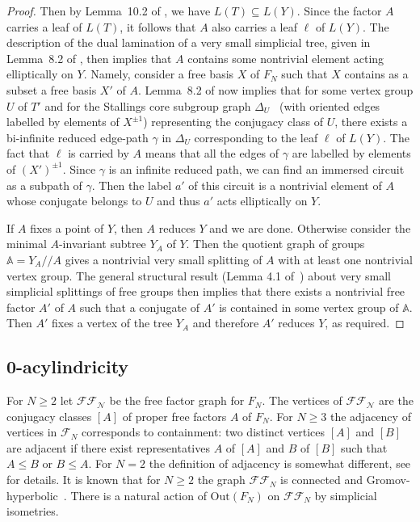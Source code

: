 \documentclass[10pt]{amsart}
\newcommand\<{\langle}
\renewcommand\>{\rangle}
\newcommand{\Out}{\mbox{Out}}
\theoremstyle{definition}
\begin{document}
\begin{proof}
Then by Lemma~10.2 of \cite{KL3}, we have $L(T)\subseteq
L(Y)$.  Since the factor $A$ carries a leaf of $L(T)$, it follows
that $A$ also carries a leaf $\ell$ of $L(Y)$. The  description of the dual lamination of a very small simplicial tree,
given in Lemma~8.2 of \cite{KL3}, then implies that $A$
contains some nontrivial element acting elliptically on $Y$. Namely, consider a free basis $X$ of $F_N$ such that $X$ contains as a subset a free basis $X'$ of $A$.  Lemma~8.2 of \cite{KL3} now implies that for some vertex group $U$ of $T'$ and for the Stallings core subgroup graph $\Delta_U$~\cite{KM} (with oriented edges labelled by elements of $X^{\pm 1}$) representing the conjugacy class of $U$, there exists a bi-infinite reduced edge-path $\gamma$ in $\Delta_U$ corresponding to the leaf $\ell$ of $L(Y)$. The fact that $\ell$ is carried by $A$ means that all the edges of $\gamma$ are labelled by elements of $(X')^{\pm 1}$. Since $\gamma$ is an infinite reduced path, we can find an immersed circuit as a subpath of $\gamma$. Then the label $a'$ of this circuit is a nontrivial element of $A$ whose conjugate belongs to $U$ and thus $a'$ acts elliptically on $Y$.

If $A$ fixes a point of $Y$, then $A$ reduces $Y$ and we are
done. Otherwise consider the minimal $A$-invariant subtree $Y_A$ of
$Y$. Then the quotient graph of groups $\mathbb A=Y_A//A$ gives a
nontrivial very small splitting of $A$ with at least one nontrivial
vertex group. The general structural result (Lemma 4.1 of~\cite{BF93}) about very small
simplicial splittings of free groups then implies that there exists a nontrivial free factor $A'$ of $A$ such that
a conjugate of $A'$ is contained in some vertex group of $\mathbb
A$. Then $A'$ fixes a vertex of the tree $Y_A$ and therefore $A'$
reduces $Y$, as required.

\end{proof}

\subsection{0-acylindricity}

For $N\ge 2$ let $\mathcal{FF_N}$ be the free factor graph for
$F_N$. The vertices of $\mathcal{FF_N}$ are the conjugacy classes
$[A]$ of proper free factors $A$ of $F_N$. For $N\ge 3$ the adjacency
of vertices in $\mathcal F_N$ corresponds to containment: two distinct
vertices $[A]$ and $[B]$ are adjacent if there exist representatives
$A$ of $[A]$ and $B$ of $[B]$ such that $A\le B$ or $B\le A$. For
$N=2$ the definition of adjacency is somewhat different, see
\cite{BF11} for details. It is known that for $N\ge 2$ the graph
$\mathcal{FF}_N$ is connected and Gromov-hyperbolic~\cite{BF11,KRa,HH}. There is a
natural action of $\Out(F_N)$ on $\mathcal{FF}_N$ by simplicial isometries.
\end{document}

